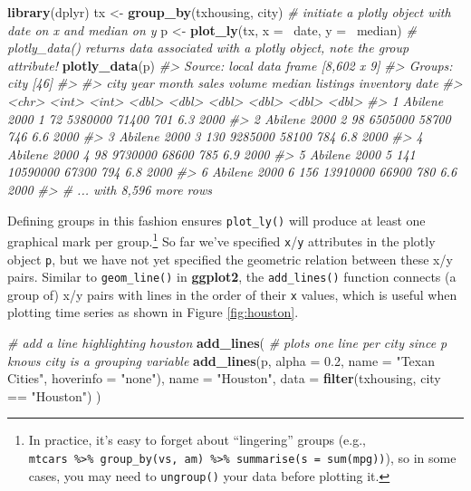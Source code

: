 \documentclass[12pt,]{isuthesis}
\newenvironment{Shaded}{\begin{snugshade}}{\end{snugshade}}
\newcommand{\KeywordTok}[1]{\textcolor[rgb]{0.13,0.29,0.53}{\textbf{{#1}}}}
\newcommand{\DataTypeTok}[1]{\textcolor[rgb]{0.13,0.29,0.53}{{#1}}}
\newcommand{\FloatTok}[1]{\textcolor[rgb]{0.00,0.00,0.81}{{#1}}}
\newcommand{\StringTok}[1]{\textcolor[rgb]{0.31,0.60,0.02}{{#1}}}
\newcommand{\CommentTok}[1]{\textcolor[rgb]{0.56,0.35,0.01}{\textit{{#1}}}}
\newcommand{\NormalTok}[1]{{#1}}
\let\rmarkdownfootnote\footnote%
\def\footnote{\protect\rmarkdownfootnote}
\begin{document}
\begin{Shaded}
\begin{Highlighting}[]
\KeywordTok{library}\NormalTok{(dplyr)}
\NormalTok{tx <-}\StringTok{ }\KeywordTok{group_by}\NormalTok{(txhousing, city)}
\CommentTok{# initiate a plotly object with date on x and median on y}
\NormalTok{p <-}\StringTok{ }\KeywordTok{plot_ly}\NormalTok{(tx, }\DataTypeTok{x =} \NormalTok{~date, }\DataTypeTok{y =} \NormalTok{~median)}
\CommentTok{# plotly_data() returns data associated with a plotly object, note the group attribute!}
\KeywordTok{plotly_data}\NormalTok{(p)}
\CommentTok{#> Source: local data frame [8,602 x 9]}
\CommentTok{#> Groups: city [46]}
\CommentTok{#> }
\CommentTok{#>      city  year month sales   volume median listings inventory  date}
\CommentTok{#>     <chr> <int> <int> <dbl>    <dbl>  <dbl>    <dbl>     <dbl> <dbl>}
\CommentTok{#> 1 Abilene  2000     1    72  5380000  71400      701       6.3  2000}
\CommentTok{#> 2 Abilene  2000     2    98  6505000  58700      746       6.6  2000}
\CommentTok{#> 3 Abilene  2000     3   130  9285000  58100      784       6.8  2000}
\CommentTok{#> 4 Abilene  2000     4    98  9730000  68600      785       6.9  2000}
\CommentTok{#> 5 Abilene  2000     5   141 10590000  67300      794       6.8  2000}
\CommentTok{#> 6 Abilene  2000     6   156 13910000  66900      780       6.6  2000}
\CommentTok{#> # ... with 8,596 more rows}
\end{Highlighting}
\end{Shaded}

Defining groups in this fashion ensures \texttt{plot\_ly()} will produce
at least one graphical mark per group.\footnote{In practice, it's easy
  to forget about ``lingering'' groups (e.g.,
  \texttt{mtcars\ \%\textgreater{}\%\ group\_by(vs,\ am)\ \%\textgreater{}\%\ summarise(s\ =\ sum(mpg))}),
  so in some cases, you may need to \texttt{ungroup()} your data before
  plotting it.} So far we've specified \texttt{x}/\texttt{y} attributes
in the plotly object \texttt{p}, but we have not yet specified the
geometric relation between these x/y pairs. Similar to
\texttt{geom\_line()} in \textbf{ggplot2}, the \texttt{add\_lines()}
function connects (a group of) x/y pairs with lines in the order of
their \texttt{x} values, which is useful when plotting time series as
shown in Figure \ref{fig:houston}.

\begin{Shaded}
\begin{Highlighting}[]
\CommentTok{# add a line highlighting houston}
\KeywordTok{add_lines}\NormalTok{(}
  \CommentTok{# plots one line per city since p knows city is a grouping variable}
  \KeywordTok{add_lines}\NormalTok{(p, }\DataTypeTok{alpha =} \FloatTok{0.2}\NormalTok{, }\DataTypeTok{name =} \StringTok{"Texan Cities"}\NormalTok{, }\DataTypeTok{hoverinfo =} \StringTok{"none"}\NormalTok{),}
  \DataTypeTok{name =} \StringTok{"Houston"}\NormalTok{, }\DataTypeTok{data =} \KeywordTok{filter}\NormalTok{(txhousing, city ==}\StringTok{ "Houston"}\NormalTok{)}
\NormalTok{)}
\end{Highlighting}
\end{Shaded}
\end{document}
